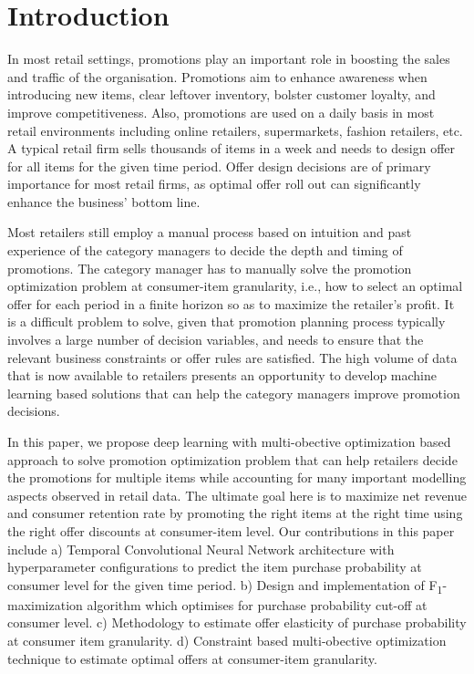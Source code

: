 \section{Introduction}
In most retail settings, promotions play an important role in boosting the sales and traffic of the organisation.
Promotions aim to enhance awareness when introducing new items, clear leftover inventory, bolster customer loyalty, 
and improve competitiveness. Also, promotions are used on a daily basis in most retail environments including online retailers, 
supermarkets, fashion retailers, etc. A typical retail firm sells thousands of items in a week and needs to design offer 
for all items for the given time period. Offer design decisions are of primary importance for most retail firms, 
as optimal offer roll out can significantly enhance the business’ bottom line.

Most retailers still employ a manual process based on intuition and past experience of the category managers
to decide the depth and timing of promotions. The category manager has to manually solve the promotion optimization problem
at consumer-item granularity, i.e., how to select an optimal offer for each period in a finite horizon so as to maximize the 
retailer’s profit. It is a difficult problem to solve, given that promotion planning process typically 
involves a large number of decision variables, and needs to ensure that the relevant business constraints or offer rules
are satisfied. The high volume of data that is now available to retailers presents an opportunity to develop 
machine learning based solutions that can help the category managers improve promotion decisions.

In this paper, we propose deep learning with multi-obective optimization based approach to solve 
promotion optimization problem that can help retailers decide the promotions for multiple items while accounting 
for many important modelling aspects observed in retail data. The ultimate goal here is to maximize net revenue and
consumer retention rate by promoting the right items at the right time using the right offer discounts at 
consumer-item level. Our contributions in this paper include a) Temporal Convolutional Neural Network architecture
with hyperparameter configurations to predict the item purchase probability at consumer level for the given time period. 
b) Design and implementation of F\textsubscript{1}-maximization algorithm which optimises for purchase 
probability cut-off at consumer level. c) Methodology to estimate offer elasticity of purchase probability at consumer 
item granularity. d) Constraint based multi-obective optimization technique to estimate optimal offers 
at consumer-item granularity.